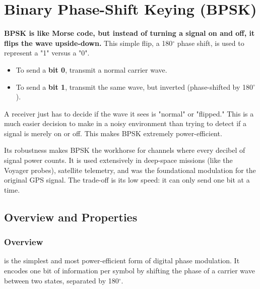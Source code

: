 
\chapter{Binary Phase-Shift Keying (BPSK)}
\label{ch:bpsk}

\begin{nontechnical}
    \textbf{BPSK is like Morse code, but instead of turning a signal on and off, it flips the wave upside-down.} This simple flip, a 180$^\circ$ phase shift, is used to represent a "1" versus a "0".

    \begin{itemize}
        \item To send a \textbf{bit 0}, transmit a normal carrier wave.
        \item To send a \textbf{bit 1}, transmit the same wave, but inverted (phase-shifted by 180$^\circ$).
    \end{itemize}

     A receiver just has to decide if the wave it sees is "normal" or "flipped." This is a much easier decision to make in a noisy environment than trying to detect if a signal is merely on or off. This makes BPSK extremely power-efficient.

     Its robustness makes BPSK the workhorse for  channels where every decibel of signal power counts. It is used extensively in deep-space missions (like the Voyager probes), satellite telemetry, and was the foundational modulation for the original GPS signal. The trade-off is its low speed: it can only send one bit at a time.
\end{nontechnical}


\section{Overview and Properties}

\subsection{Overview}

 is the simplest and most power-efficient form of digital phase modulation. It encodes one bit of information per symbol by shifting the phase of a carrier wave between two states, separated by 180$^\circ$.

